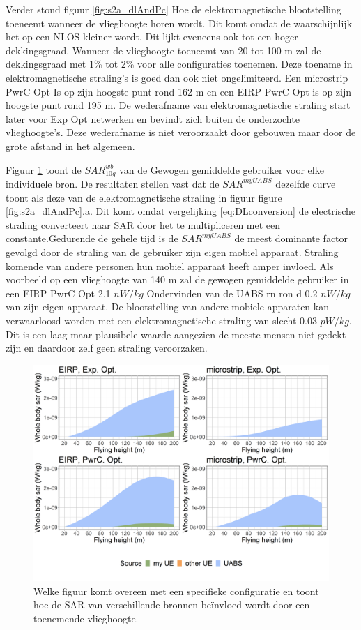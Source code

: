 \documentclass[twocolumn]{phdsymp_dutch}
\begin{document}
Verder stond figuur  \ref{fig:s2a_dlAndPc} Hoe de elektromagnetische blootstelling toeneemt wanneer de vlieghoogte horen wordt. 
Dit komt omdat de waarschijnlijk het op een \gls{NLOS} kleiner wordt.
Dit lijkt eveneens ook tot een hoger dekkingsgraad.
Wanneer de vlieghoogte toeneemt van 20 tot 100 m zal de dekkingsgraad met 1\% tot 2\% voor alle configuraties toenemen.
Deze toename in elektromagnetische straling's is goed dan ook niet ongelimiteerd. Een microstrip \gls{PwrC Opt}
Is op zijn hoogste punt rond 162 m en een \gls{EIRP} \gls{PwrC Opt} is op zijn hoogste punt rond 195 m.
De wederafname van elektromagnetische straling start later voor \gls{Exp Opt} netwerken 
en bevindt zich buiten de onderzochte vlieghoogte's. 
Deze wederafname is niet veroorzaakt door gebouwen maar door de grote afstand in het algemeen.

Figuur \ref{fig:s2shfourSourcesMatrix} toont de $SAR^{wb}_{10g}$ van de Gewogen gemiddelde gebruiker voor elke individuele bron.
De resultaten stellen vast dat de $SAR^{myUABS}$ dezelfde curve toont als deze van de elektromagnetische straling in figuur
figure \ref{fig:s2a_dlAndPc}.a. Dit komt omdat vergelijking \ref{eq:DLconversion} de electrische straling converteert naar \gls{SAR}
door het te multipliceren met een constante.Gedurende de gehele tijd is de $SAR^{myUABS}$
de meest dominante factor gevolgd door de straling van de gebruiker zijn eigen mobiel apparaat.
Straling komende van andere personen hun mobiel apparaat heeft amper invloed.
Als voorbeeld op een vlieghoogte van 140 m zal de gewogen gemiddelde gebruiker in een
\gls{EIRP} \gls{PwrC Opt} 2.1 $nW/kg$ Ondervinden van de  \gls{UABS} rn ron d
 0.2 $nW/kg$ van zijn eigen apparaat.
De blootstelling van andere mobiele apparaten kan verwaarloosd worden met een elektromagnetische straling van slecht
 0.03 $pW/kg$. Dit is een laag maar plausibele waarde aangezien de meeste mensen niet gedekt zijn 
en daardoor zelf geen straling veroorzaken.


\begin{figure}[h!]
  \includegraphics[width=\linewidth]{s2/fhFourSources.png}
  \caption{ Welke figuur komt overeen met een specifieke configuratie en toont hoe de 
     \acs{SAR} van verschillende bronnen be\"invloed wordt door een toenemende vlieghoogte.}
  \label{fig:s2shfourSourcesMatrix}
\end{figure}
\end{document}

